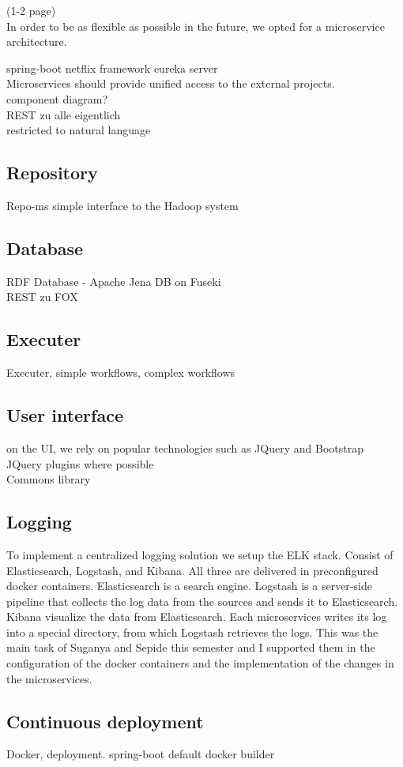 (1-2 page)\\
In order to be as flexible as possible in the future, we opted for a microservice architecture. 

spring-boot netflix framework eureka server\\
Microservices should provide unified access to the external projects.\\
component diagram?\\
REST zu alle eigentlich\\
restricted to natural language\\

\subsection{Repository}
Repo-ms simple interface to the Hadoop system\\

\subsection{Database}
RDF Database - Apache Jena DB on Fuseki\\
REST zu FOX\\

\subsection{Executer}
Executer, simple workflows, complex workflows\\

\subsection{User interface}
on the UI, we rely on popular technologies such as JQuery and Bootstrap\\
JQuery plugins where possible\\
Commons library\\

\subsection{Logging}
To implement a centralized logging solution we setup the ELK stack. Consist of Elasticsearch, Logstash, and Kibana. All three are delivered in preconfigured docker containers. Elasticsearch is a search engine. Logstash is a server‑side pipeline that collects the log data from the sources and sends it to Elasticsearch. Kibana visualize the data from Elasticsearch. Each microservices writes its log into a special directory, from which Logstash retrieves the logs. This was the main task of Suganya and Sepide this semester and I supported them in the configuration of the docker containers and the implementation of the changes in the microservices.

\subsection{Continuous deployment}
Docker, deployment. spring-boot default docker builder\\